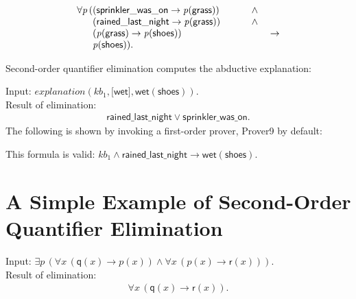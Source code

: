 \documentclass[a4paper]{article}
\newcommand{\imp}{\rightarrow}
\newcommand{\pplmacro}[1]{\mathit{#1}}
\newcommand{\pplIsValid}[1]{\noindent This formula is valid: $#1$\par}
\newcounter{def}
\begin{document}
\[\begin{array}{lllll}
\forall \mathit{p} \, ((\mathsf{sprinkler\_was\_on} \imp  \mathit{p}(\mathsf{grass})) &&&\; \land \\
\hphantom{\forall \mathit{p} \, (} (\mathsf{rained\_last\_night} \imp  \mathit{p}(\mathsf{grass})) &&&\; \land \\
\hphantom{\forall \mathit{p} \, (} (\mathit{p}(\mathsf{grass}) \imp  \mathit{p}(\mathsf{shoes})) &&&&\; \imp \\
\hphantom{\forall \mathit{p} \, (} \mathit{p}(\mathsf{shoes})).
\end{array}
\]
%
%
 \par\medskip\noindent Second-order quantifier elimination
    computes the abductive explanation: \par\medskip

\noindent Input: $\pplmacro{explanation}(\pplmacro{kb_{1}},{[}\mathsf{wet}{]},\mathsf{wet}(\mathsf{shoes})).$\\
\noindent Result of elimination:
\[\begin{array}{lllll}
\mathsf{rained\_last\_night} \lor  \mathsf{sprinkler\_was\_on}.
\end{array}
\]
%
%
 \noindent The following is shown by invoking a first-order prover, Prover9
    by default: \par\medskip
\pplIsValid{\pplmacro{kb_{1}} \land  \mathsf{rained\_last\_night} \imp  \mathsf{wet}(\mathsf{shoes}).}
%
%
 \section{A Simple Example of Second-Order Quantifier Elimination}

\noindent Input: $\exists \mathit{p} \, (\forall \mathit{x} \, (\mathsf{q}(\mathit{x}) \imp  \mathit{p}(\mathit{x})) \land  \forall \mathit{x} \, (\mathit{p}(\mathit{x}) \imp  \mathsf{r}(\mathit{x}))).$\\
\noindent Result of elimination:
\[\begin{array}{lllll}
\forall \mathit{x} \, (\mathsf{q}(\mathit{x}) \imp  \mathsf{r}(\mathit{x})).
\end{array}
\]
%
%
\end{document}

